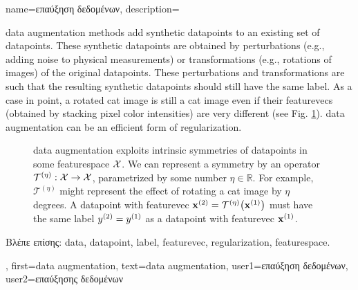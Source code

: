 {name={\foreignlanguage{greek}{επαύξηση δεδομένων}},
	description={\Gls{data} augmentation 
		methods add synthetic \gls{datapoint}s 
		to an existing set of \gls{datapoint}s. These synthetic \gls{datapoint}s are obtained by 
		perturbations (e.g., adding noise to physical measurements) or transformations 
		(e.g., rotations of images) of the original \gls{datapoint}s. These perturbations and 
		transformations are such that the resulting synthetic \gls{datapoint}s should 
		still have the same \gls{label}. As a case in point, a rotated cat image is still 
		a cat image even if their \gls{featurevec}s (obtained by stacking pixel color intensities) 
		are very different (see Fig. \ref{fig_symmetry_dataaug_dict}). \Gls{data} augmentation can be an 
		efficient form of \gls{regularization}.
		\begin{figure}[H]
		\begin{center}
			  \vspace*{-11mm}
		\end{center}
		\caption{\Gls{data} augmentation exploits intrinsic symmetries of \gls{datapoint}s in 
		some \gls{featurespace} $\mathcal{X}$. We can represent a symmetry by 
		an operator $\mathcal{T}^{(\eta)}: \mathcal{X} \rightarrow \mathcal{X}$,
		parametrized by some number $\eta \in \mathbb{R}$. For example, $\mathcal{T}^{(\eta)}$ 
		might represent the effect of rotating a cat image by $\eta$ degrees. A \gls{datapoint} 
		with \gls{featurevec} ${\bf x}^{(2)} = \mathcal{T}^{(\eta)} \big({\bf x}^{(1)} \big)$ must 
		have the same \gls{label} $y^{(2)}=y^{(1)}$ as a \gls{datapoint} 
		with \gls{featurevec} ${\bf x}^{(1)}$.\label{fig_symmetry_dataaug_dict}}
		\end{figure} 
		\foreignlanguage{greek}{Βλέπε επίσης:} \gls{data}, \gls{datapoint}, \gls{label}, \gls{featurevec}, \gls{regularization}, \gls{featurespace}. },
	first={data augmentation},
	text={data augmentation},
	user1={\foreignlanguage{greek}{επαύξηση δεδομένων}}, %
  	user2={\foreignlanguage{greek}{επαύξησης δεδομένων}} %
}

